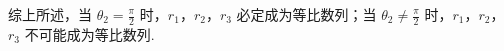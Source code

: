 \documentclass[UTF8,a4paper,oneside,11pt]{ctexbook}
\begin{document}
\begin{solution}
\begin{enumerate}
\begin{enumerate}
\end{enumerate}
综上所述，当 \(\theta_2=\frac{\pi}{2}\) 时，\(r_1\)，\(r_2\)，\(r_3\) 必定成为等比数列；当 \(\theta_2\neq \frac{\pi}{2}\) 时，\(r_1\)，\(r_2\)，\(r_3\) 不可能成为等比数列.
\end{enumerate}
\end{solution}

\end{document}
